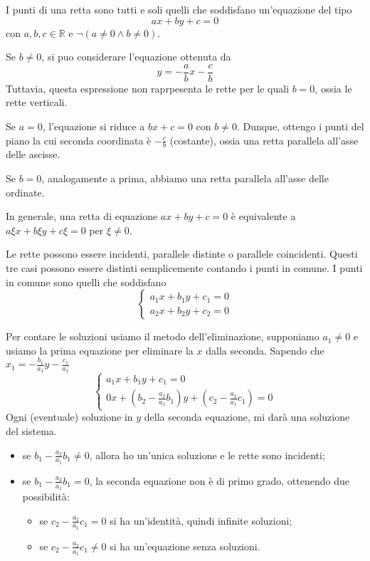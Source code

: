 \documentclass[a4paper]{article}
\begin{document}
I punti di una retta sono tutti e soli quelli che soddisfano un'equazione del tipo
\[
    ax+by+c=0
\]
con \(a,b,c \in \mathbb{R}\) e \(\lnot (a \neq 0 \land b \neq 0)\).

Se \(b\neq 0\), si puo considerare l'equazione ottenuta da
\[
    y=-\frac{a}{b}x - \frac{c}{b}
\]
Tuttavia, questa espressione non raprpesenta le rette per le quali \(b=0\), ossia le rette verticali.

Se \(a=0\), l'equazione si riduce a \(bx+c=0\) con \(b\neq 0\).
Dunque, ottengo i punti del piano la cui seconda coordinata è \(-\frac{c}{b}\) (costante),
ossia una retta parallela all'asse delle ascisse.

Se \(b=0\), analogamente a prima, abbiamo una retta parallela all'asse delle ordinate.

In generale, una retta di equazione \(ax+by+c=0\) è equivalente a \(a\xi x + b\xi y + c\xi = 0\)
per \(\xi\neq 0\).

Le rette possono essere incidenti, parallele distinte o parallele coincidenti.
Questi tre casi possono essere distinti semplicemente contando i punti in comune.
I punti in comune sono quelli che soddisfano
\[
    \begin{cases}
        a_1x + b_1y+c_1=0 \\
        a_2x + b_2y+c_2=0
    \end{cases}
\]

Per contare le soluzioni usiamo  il metodo dell'eliminazione,
supponiamo \(a_1\neq 0\) e usiamo la prima equazione per eliminare la \(x\) dalla seconda.
Sapendo che \(x_1=-\frac{b_1}{a_1}y - \frac{c_1}{a_1}\)
\[
    \begin{cases}
        a_1x + b_1y+c_1=0 \\
        0x + \left(b_2 - \frac{a_2}{a_1}b_1\right)y + \left(c_2-\frac{a_2}{a_1}c_1\right) = 0
    \end{cases}
\]
Ogni (eventuale) soluzione in \(y\) della seconda equazione, mi darà una soluzione del sistema.
\begin{itemize}
    \item se \(b_1 - \frac{a_2}{a_1}b_1 \neq 0\), allora ho un'unica soluzione e le rette sono incidenti;
    \item se \(b_1 - \frac{a_2}{a_1}b_1 = 0\), la seconda equazione non è di primo grado, ottenendo due possibilità:
    \begin{itemize}
        \item se \(c_2 - \frac{a_2}{a_1}c_1 = 0\) si ha un'identità, quindi infinite soluzioni;
        \item se \(c_2 - \frac{a_2}{a_1}c_1 \neq 0\) si ha un'equazione senza soluzioni.
    \end{itemize}
\end{itemize}
\end{document}
